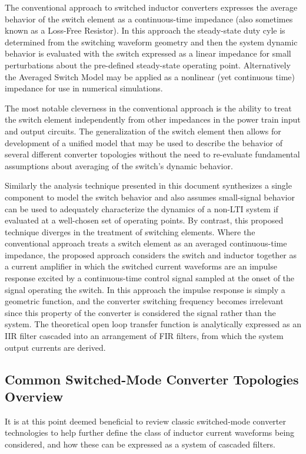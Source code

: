 \documentclass[conference]{IEEEtran}
\begin{document}
The conventional approach to switched inductor converters expresses the average behavior of the switch element as a continuous-time impedance (also sometimes known as a Loss-Free Resistor).  In this approach the steady-state duty cyle is determined from the switching waveform geometry and then the system dynamic behavior is evaluated with the switch expressed as a linear impedance for small perturbations about the pre-defined steady-state operating point. Alternatively the Averaged Switch Model may be applied as a nonlinear (yet continuous time) impedance for use in numerical simulations.

The most notable cleverness in the conventional approach is the ability to treat the switch element independently from other impedances in the power train input and output circuits.  The generalization of the switch element then allows for development of a unified model that may be used to describe the behavior of several different converter topologies without the need to re-evaluate fundamental assumptions about averaging of the switch's dynamic behavior.

Similarly the analysis technique presented in this document synthesizes a single component to model the switch behavior and also assumes small-signal behavior can be used to adequately characterize the dynamics of a non-LTI system if evaluated at a well-chosen set of operating points. By contrast, this proposed technique diverges in the treatment of switching elements.  Where the conventional approach treats a switch element as an averaged continuous-time impedance, the proposed approach considers the switch and inductor together as a current amplifier in which the switched current waveforms are an impulse response excited by a continuous-time control signal sampled at the onset of the signal operating the switch.  In this approach the impulse response is simply a geometric function, and the converter switching frequency becomes irrelevant since this property of the converter is considered the signal rather than the system. The theoretical open loop transfer function is analytically expressed as an IIR filter cascaded into an arrangement of FIR filters, from which the system output currents are derived.


\subsection{Common Switched-Mode Converter Topologies Overview}

It is at this point deemed beneficial to review classic switched-mode converter technologies to help further define the class of inductor current waveforms being considered, and how these can be expressed as a system of cascaded filters.
\end{document}
